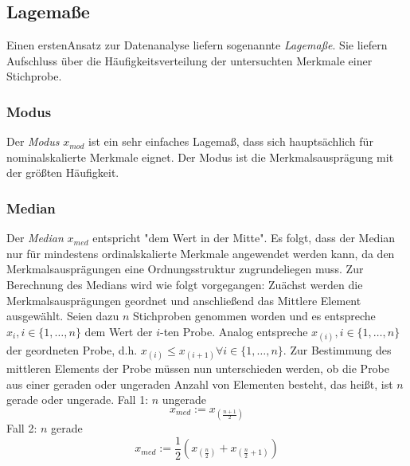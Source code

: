 \documentclass[a4paper]{scrartcl}
\begin{document}
\begin{multicols}{2}
                \subsection{Lagemaße}
                    Einen erstenAnsatz zur Datenanalyse liefern sogenannte \emph{Lagemaße}. Sie liefern Aufschluss über die Häufigkeitsverteilung der untersuchten Merkmale einer Stichprobe. \cite{kohn2005}
                    \subsubsection{Modus}
                        Der \emph{Modus} $x_{mod}$ ist ein sehr einfaches Lagemaß, dass sich hauptsächlich für nominalskalierte Merkmale eignet. Der Modus ist die Merkmalsausprägung mit der größten Häufigkeit. \cite{kohn2005}
                    \subsubsection{Median}
                        Der \emph{Median} $x_{med}$ entspricht "dem Wert in der Mitte". Es folgt, dass der Median nur für mindestens ordinalskalierte Merkmale angewendet werden kann, da den Merkmalsausprägungen eine Ordnungsstruktur zugrundeliegen muss. \cite{kohn2005}
                        \newline
                        Zur Berechnung des Medians wird wie folgt vorgegangen: Zuächst werden die Merkmalsausprägungen geordnet und anschließend das Mittlere Element ausgewählt. Seien dazu $n$ Stichproben genommen worden und es entspreche $x_i,i \in \{1,\dots,n\}$ dem Wert der $i$-ten Probe. Analog entspreche $x_{(i)}, i \in \{1,\dots,n\}$ der geordneten Probe, d.h. $x_{(i)} \leq x_{(i+1)} \forall i \in \{1,\dots,n\}$.
                        \newline
                        Zur Bestimmung des mittleren Elements der Probe müssen nun unterschieden werden, ob die Probe aus einer geraden oder ungeraden Anzahl von Elementen besteht, das heißt, ist $n$ gerade oder ungerade.
                        \newline
                        Fall 1:
                        \newline
                        $n$ ungerade
                        $$ x_{med} := x_{(\frac{n+1}{2})} $$
                        Fall 2:
                        \newline
                        $n$ gerade
                        $$ x_{med} := \frac{1}{2}\left( x_{(\frac{n}{2})} + x_{(\frac{n}{2}+1)} \right) $$

\end{multicols}
\end{document}
